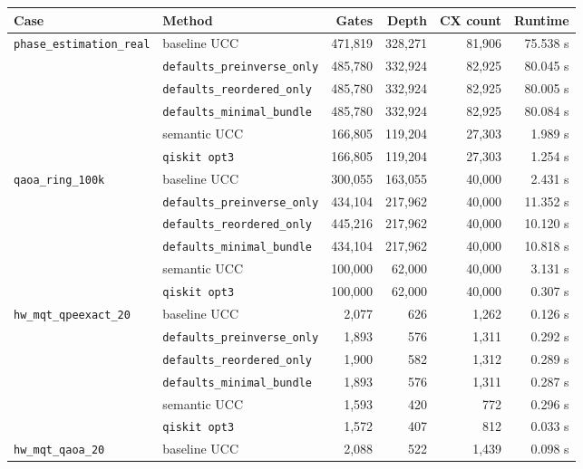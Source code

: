 \documentclass[11pt]{article}
\begin{document}
\begin{table}[t]
\centering
\scriptsize
\begin{tabular}{llrrrr}
\toprule
Case & Method & Gates & Depth & CX count & Runtime \\
\midrule
\multirow{6}{*}{\texttt{phase\_estimation\_real}}
  & baseline UCC & 471{,}819 & 328{,}271 & 81{,}906 & 75.538 s \\
  & \texttt{defaults\_preinverse\_only} & 485{,}780 & 332{,}924 & 82{,}925 & 80.045 s \\
  & \texttt{defaults\_reordered\_only} & 485{,}780 & 332{,}924 & 82{,}925 & 80.005 s \\
  & \texttt{defaults\_minimal\_bundle} & 485{,}780 & 332{,}924 & 82{,}925 & 80.084 s \\
  & semantic UCC & 166{,}805 & 119{,}204 & 27{,}303 & 1.989 s \\
  & \texttt{qiskit opt3} & 166{,}805 & 119{,}204 & 27{,}303 & 1.254 s \\
\midrule
\multirow{6}{*}{\texttt{qaoa\_ring\_100k}}
  & baseline UCC & 300{,}055 & 163{,}055 & 40{,}000 & 2.431 s \\
  & \texttt{defaults\_preinverse\_only} & 434{,}104 & 217{,}962 & 40{,}000 & 11.352 s \\
  & \texttt{defaults\_reordered\_only} & 445{,}216 & 217{,}962 & 40{,}000 & 10.120 s \\
  & \texttt{defaults\_minimal\_bundle} & 434{,}104 & 217{,}962 & 40{,}000 & 10.818 s \\
  & semantic UCC & 100{,}000 & 62{,}000 & 40{,}000 & 3.131 s \\
  & \texttt{qiskit opt3} & 100{,}000 & 62{,}000 & 40{,}000 & 0.307 s \\
\midrule
\multirow{6}{*}{\texttt{hw\_mqt\_qpeexact\_20}}
  & baseline UCC & 2{,}077 & 626 & 1{,}262 & 0.126 s \\
  & \texttt{defaults\_preinverse\_only} & 1{,}893 & 576 & 1{,}311 & 0.292 s \\
  & \texttt{defaults\_reordered\_only} & 1{,}900 & 582 & 1{,}312 & 0.289 s \\
  & \texttt{defaults\_minimal\_bundle} & 1{,}893 & 576 & 1{,}311 & 0.287 s \\
  & semantic UCC & 1{,}593 & 420 & 772 & 0.296 s \\
  & \texttt{qiskit opt3} & 1{,}572 & 407 & 812 & 0.033 s \\
\midrule
\multirow{6}{*}{\texttt{hw\_mqt\_qaoa\_20}}
  & baseline UCC & 2{,}088 & 522 & 1{,}439 & 0.098 s \\

\end{tabular}
\end{table}
\end{document}
